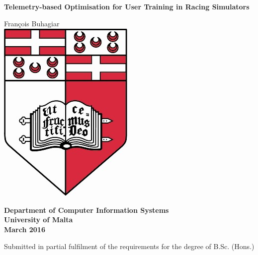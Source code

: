 \documentclass{article}
\begin{document}
\begin{titlepage}
	\begin{center}
		\begin{spacing}{1.5}
			\huge{\textbf{Telemetry-based Optimisation for User Training in Racing Simulators}}
		\end{spacing}
		
		\LARGE{François Buhagiar}
		\vspace{5mm}\\
		\includegraphics[scale=4]{images/UOM_Logo}
		
		\begin{spacing}{1.5}
			\huge{\textbf{Department of Computer Information Systems\\
			\vspace{5mm}
				University of Malta\\
				March 2016 }}
		\end{spacing}
	
		\Large \vfill Submitted in partial fulfilment of the requirements for the degree of B.Sc. (Hons.)
		\clearpage
	\end{center}
\end{titlepage}


\newpage
{} 
\setcounter{page}{1}
\end{document}
